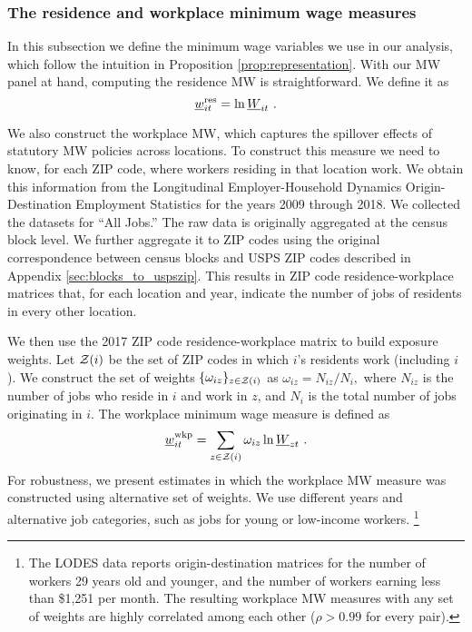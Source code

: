 \subsubsection{The residence and workplace minimum wage measures}
\label{sec:data_mw_measures}

In this subsection we define the minimum wage variables we use in our analysis,
which follow the intuition in Proposition \ref{prop:representation}.
With our MW panel at hand, computing the residence MW is straightforward.
We define it as
\begin{equation*}
    \underline{w}^{\text{res}}_{it} = \ln \underline{W}_{it} \ .
\end{equation*}

We also construct the workplace MW, which captures the spillover effects of
statutory MW policies across locations.
To construct this measure we need to know, for each ZIP code, where workers 
residing in that location work.
We obtain this information from the Longitudinal Employer-Household 
Dynamics Origin-Destination Employment Statistics \parencite[LODES;][]{CensusLODES}
for the years 2009 through 2018.
We collected the datasets for ``All Jobs.''
The raw data is originally aggregated at the census block level. 
We further aggregate it to ZIP codes using the original correspondence between 
census blocks and USPS ZIP codes described in Appendix 
\ref{sec:blocks_to_uspszip}.
This results in ZIP code residence-workplace matrices that, for each location 
and year, indicate the number of jobs of residents in every other location.

We then use the 2017 ZIP code residence-workplace matrix to build exposure 
weights.
Let $\mathcal{Z}(i)$ be the set of ZIP codes in which $i$'s residents work 
(including $i$).
We construct the set of weights $\{\omega_{iz}\}_{z\in\mathcal{Z}(i)}$ as 
$ \omega_{iz} = N_{iz}/{N_i} , $
where 
$N_{iz}$ is the number of jobs who reside in $i$ and work in $z$, 
and $N_i$ is the total number of jobs originating in $i$.
The workplace minimum wage measure is defined as
\begin{equation*}\label{eq:mw_wkp_definition}
    \mw^{\wkp}_{it} = \sum_{z\in\Z(i)} \omega_{iz} \ln \MW_{zt} \ .
\end{equation*}
For robustness, we present estimates in which the workplace MW measure
was constructed using alternative set of weights.
We use different years and alternative job categories,
such as jobs for young or low-income workers.%
\footnote{The LODES data reports origin-destination matrices for the 
number of workers 29 years old and younger, and the number of workers 
earning less than \$1,251 per month.
The resulting workplace MW measures with any set of weights are highly correlated 
among each other ($\rho>0.99$ for every pair).}


